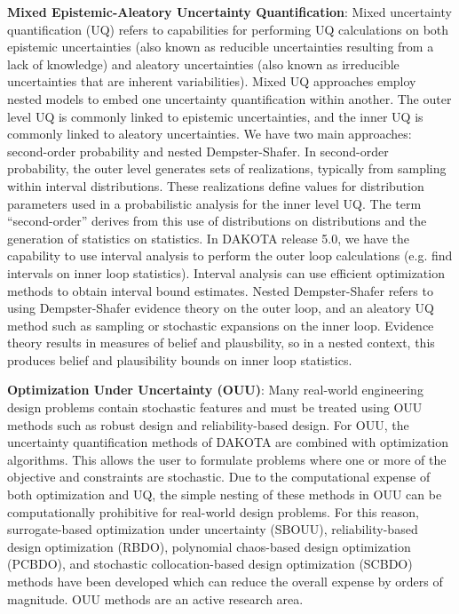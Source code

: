 \textbf{Mixed Epistemic-Aleatory Uncertainty Quantification}: 
Mixed uncertainty quantification (UQ) refers to capabilities for 
performing UQ calculations on both epistemic uncertainties (also 
known as reducible uncertainties resulting from a lack of knowledge) 
and aleatory uncertainties (also known as irreducible uncertainties 
that are inherent variabilities).  Mixed UQ approaches employ nested 
models to embed one uncertainty quantification
within another.  The outer level UQ is commonly linked to epistemic
uncertainties, and the inner UQ is commonly linked to aleatory
uncertainties.  We have two 
main approaches: second-order probability and nested Dempster-Shafer. 
In second-order probability, the outer level generates sets of realizations,
typically from sampling within interval distributions.  These
realizations define values for distribution parameters used in a
probabilistic analysis for the inner level UQ.  The term
``second-order'' derives from this use of distributions on
distributions and the generation of statistics on statistics.
In DAKOTA release 5.0, we have the capability to use interval 
analysis to perform the outer loop calculations (e.g. find intervals 
on inner loop statistics).  Interval analysis can use efficient optimization 
methods to obtain interval bound estimates.  Nested 
Dempster-Shafer refers to using Dempster-Shafer evidence theory on the 
outer loop, and an aleatory UQ method such as sampling or 
stochastic expansions on the inner loop.  Evidence theory 
results in measures of belief and plausbility, so in a nested context, 
this produces belief and plausibility bounds on inner loop statistics.

\textbf{Optimization Under Uncertainty (OUU)}: Many real-world
engineering design problems contain stochastic features and must be
treated using OUU methods such as robust design and reliability-based
design. For OUU, the uncertainty quantification methods of DAKOTA are
combined with optimization algorithms. This allows the user to
formulate problems where one or more of the objective and constraints
are stochastic. Due to the computational expense of both optimization
and UQ, the simple nesting of these methods in OUU can be
computationally prohibitive for real-world design problems. For this
reason, surrogate-based optimization under uncertainty (SBOUU),
reliability-based design optimization (RBDO), polynomial chaos-based
design optimization (PCBDO), and stochastic collocation-based design
optimization (SCBDO) methods have been developed which can reduce the
overall expense by orders of magnitude. OUU methods are an active
research area.

